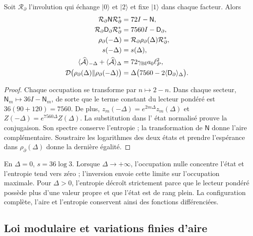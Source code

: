 \begin{theorem}
\label{vii:vii:thm:inversion-sectorial}
Soit \(\mathcal R_\partial\) l'involution qui échange
\(|0\rangle\) et \(|2\rangle\) et fixe \(|1\rangle\) dans chaque
facteur. Alors
\begin{align}
 \mathcal R_\partial\mathsf N\mathcal R_\partial^*&=72I-\mathsf N,\\
 \mathcal R_\partial\mathsf D_\partial\mathcal R_\partial^*
 &=7560I-\mathsf D_\partial,\\
 \rho_\partial(-\Delta)&=\mathcal R_\partial\rho_\partial(\Delta)
                          \mathcal R_\partial^*,\\
 s(-\Delta)&=s(\Delta),\\
 \langle\widehat{\mathcal A}\rangle_{-\Delta}
 +\langle\widehat{\mathcal A}\rangle_\Delta
 &=72\gamma_{\rm BI}a_0\ell_P^2,\\
 \mathcal D\bigl(\rho_\partial(\Delta)\Vert\rho_\partial(-\Delta)\bigr)
 &=\Delta\bigl(7560-2\langle\mathsf D_\partial\rangle_\Delta\bigr).
 \label{vii:vii:eq:inversion-sectorial}
\end{align}
\end{theorem}
\begin{proof}
Chaque occupation se transforme par \(n\mapsto2-n\). Dans chaque secteur,
\(\mathsf N_m\mapsto36I-\mathsf N_m\), de sorte que le terme
constant du lecteur pondéré est \(36(90+120)=7560\).
De plus, \(z_m(-\Delta)=e^{2m\Delta}z_m(\Delta)\) et
\(Z(-\Delta)=e^{7560\Delta}Z(\Delta)\). La substitution dans l'
état normalisé prouve la conjugaison. Son spectre conserve l'entropie ;
la transformation de \(\mathsf N\) donne l'aire complémentaire. Soustraire
les logarithmes des deux états et prendre l'espérance dans
\(\rho_\partial(\Delta)\) donne la dernière égalité.
\end{proof}

En \(\Delta=0\), \(s=36\log3\). Lorsque \(\Delta\to+\infty\),
l'occupation nulle concentre l'état et l'entropie tend vers zéro ;
l'inversion envoie cette limite sur l'occupation maximale. Pour \(\Delta>0\),
l'entropie décroît strictement parce que le lecteur pondéré possède plus
d'une valeur propre et que l'état est de rang plein. La configuration
complète, l'aire et l'entropie conservent ainsi des fonctions différenciées.

\subsection{Loi modulaire et variations finies d'aire}
\label{vii:vii:subsec:ley-modular-finita}

